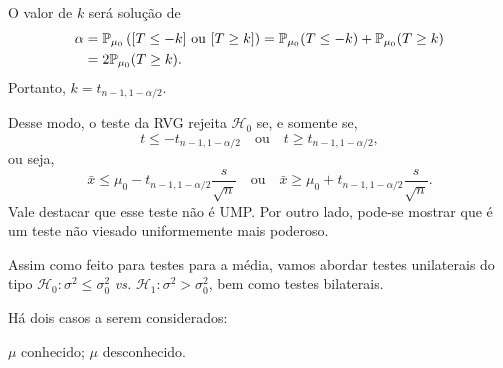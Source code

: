 \begin{theorem}[$\mathcal{H}_0:\mu=\mu_0$ \emph{vs.} $\mathcal{H}_1:\mu\neq\mu_0$ -- $\sigma^2$ desconhecido]
O valor de $k$ será solução de
\begin{align}
\alpha &= \P_{\mu_0}\left([T\leq-k]\text{ ou }[T\geq k]\right) = \P_{\mu_0}(T\leq-k)+\P_{\mu_0}(T\geq k)\notag\\
&= 2\P_{\mu_0}(T\geq k).
\end{align}
Portanto, $k=t_{n-1,1-\alpha/2}$.

Desse modo, o teste da RVG rejeita $\mathcal{H}_0$ se, e somente se,
\begin{equation}
t\leq-t_{n-1,1-\alpha/2} \quad \text{ou} \quad t\geq t_{n-1,1-\alpha/2},
\end{equation}
ou seja,
\begin{equation}
\bar{x}\leq\mu_0-t_{n-1,1-\alpha/2}\frac{s}{\sqrt{n}} \quad \text{ou} \quad \bar{x}\geq\mu_0+t_{n-1,1-\alpha/2}\frac{s}{\sqrt{n}}.
\end{equation}
Vale destacar que esse teste não é UMP. Por outro lado, pode-se mostrar que é um teste não viesado uniformemente mais poderoso.
\end{theorem}

Assim como feito para testes para a média, vamos abordar testes unilaterais do tipo $\mathcal{H}_0:\sigma^2\leq\sigma_0^2$ \emph{vs.} $\mathcal{H}_1:\sigma^2>\sigma_0^2$, bem como testes bilaterais.

Há dois casos a serem considerados:
\begin{outline}
\1 $\mu$ conhecido;
\1 $\mu$ desconhecido.
\end{outline}

